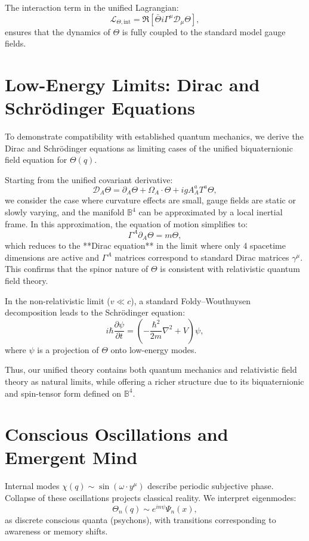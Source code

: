 \documentclass[12pt]{article}
\begin{document}
The interaction term in the unified Lagrangian:
\[
\mathcal{L}_{\Theta, \text{int}} = \Re \left[ \bar{\Theta} i \Gamma^\mu \mathcal{D}_\mu \Theta \right],
\]
ensures that the dynamics of \(\Theta\) is fully coupled to the standard model gauge fields.

\section{Low-Energy Limits: Dirac and Schrödinger Equations}

To demonstrate compatibility with established quantum mechanics, we derive the Dirac and Schrödinger equations as limiting cases of the unified biquaternionic field equation for \(\Theta(q)\).

Starting from the unified covariant derivative:
\[
\mathcal{D}_A \Theta = \partial_A \Theta + \Omega_A \cdot \Theta + i g A_A^a T^a \Theta,
\]
we consider the case where curvature effects are small, gauge fields are static or slowly varying, and the manifold \(\mathbb{B}^4\) can be approximated by a local inertial frame. In this approximation, the equation of motion simplifies to:
\[
\Gamma^A \partial_A \Theta = m \Theta,
\]
which reduces to the **Dirac equation** in the limit where only 4 spacetime dimensions are active and \(\Gamma^A\) matrices correspond to standard Dirac matrices \(\gamma^\mu\). This confirms that the spinor nature of \(\Theta\) is consistent with relativistic quantum field theory.

In the non-relativistic limit (\(v \ll c\)), a standard Foldy–Wouthuysen decomposition leads to the Schrödinger equation:
\[
i \hbar \frac{\partial \psi}{\partial t} = \left( -\frac{\hbar^2}{2m} \nabla^2 + V \right) \psi,
\]
where \(\psi\) is a projection of \(\Theta\) onto low-energy modes.

Thus, our unified theory contains both quantum mechanics and relativistic field theory as natural limits, while offering a richer structure due to its biquaternionic and spin-tensor form defined on \(\mathbb{B}^4\).

\section{Conscious Oscillations and Emergent Mind}

Internal modes \( \chi(q) \sim \sin(\omega \cdot y^\mu) \) describe periodic subjective phase. Collapse of these oscillations projects classical reality. We interpret eigenmodes:
\[
\Theta_n(q) \sim e^{i n \psi} \Psi_n(x),
\]
as discrete conscious quanta (psychons), with transitions corresponding to awareness or memory shifts.
\end{document}
